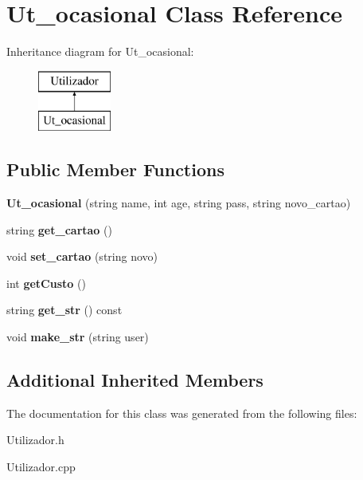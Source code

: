 \hypertarget{class_ut__ocasional}{\section{Ut\+\_\+ocasional Class Reference}
\label{class_ut__ocasional}
}
Inheritance diagram for Ut\+\_\+ocasional\+:\begin{figure}[H]
\begin{center}
\leavevmode
\includegraphics[height=2.000000cm]{class_ut__ocasional}
\end{center}
\end{figure}
\subsection*{Public Member Functions}
\begin{DoxyCompactItemize}
\item 
\hypertarget{class_ut__ocasional_acf3a4c7d6ef3d9000c6284a93201d4b1}{{\bfseries Ut\+\_\+ocasional} (string name, int age, string pass, string novo\+\_\+cartao)}\label{class_ut__ocasional_acf3a4c7d6ef3d9000c6284a93201d4b1}

\item 
\hypertarget{class_ut__ocasional_a5a455dacffda809dd8a383896174dd07}{string {\bfseries get\+\_\+cartao} ()}\label{class_ut__ocasional_a5a455dacffda809dd8a383896174dd07}

\item 
\hypertarget{class_ut__ocasional_a4c4005d41c818c737d56121ec9a79e19}{void {\bfseries set\+\_\+cartao} (string novo)}\label{class_ut__ocasional_a4c4005d41c818c737d56121ec9a79e19}

\item 
\hypertarget{class_ut__ocasional_a372c795cc67b402e54dc78e6e24c3779}{int {\bfseries get\+Custo} ()}\label{class_ut__ocasional_a372c795cc67b402e54dc78e6e24c3779}

\item 
\hypertarget{class_ut__ocasional_a500c4745815fed11a495c258a06f973a}{string {\bfseries get\+\_\+str} () const }\label{class_ut__ocasional_a500c4745815fed11a495c258a06f973a}

\item 
\hypertarget{class_ut__ocasional_a215c8d086f1285c12e5bb8b42ccef682}{void {\bfseries make\+\_\+str} (string user)}\label{class_ut__ocasional_a215c8d086f1285c12e5bb8b42ccef682}

\end{DoxyCompactItemize}
\subsection*{Additional Inherited Members}


The documentation for this class was generated from the following files\+:\begin{DoxyCompactItemize}
\item 
Utilizador.\+h\item 
Utilizador.\+cpp\end{DoxyCompactItemize}
